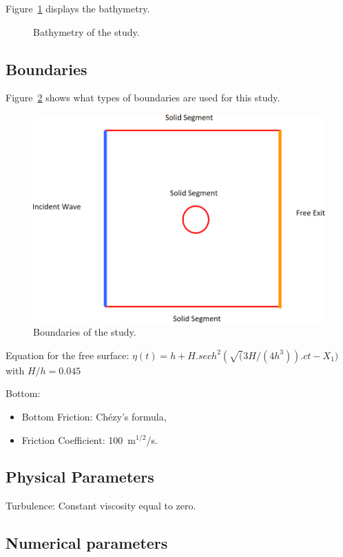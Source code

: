 Figure~\ref{fig:island:bathy} displays the bathymetry.

\begin{figure}[H]
\centering
{}
\caption{Bathymetry of the study.}\label{fig:island:bathy}
\end{figure}


\subsection{Boundaries}

Figure~\ref{fig:island:boundaries} shows what types of boundaries are used for
this study.
\begin{figure}[H]
\centering
\includegraphics[width=.6\textwidth]{img/boundaries.png}
\caption{Boundaries of the study.}\label{fig:island:boundaries}
\end{figure}

Equation for the free surface:
$\eta(t)= h+H.sech^{2}(\sqrt(3H/(4h^{3})).ct-X_{1})$ with $H/h=0.045$

Bottom:
\begin{itemize}
\item Bottom Friction: Chézy's formula,
\item Friction Coefficient: 100~m$^{1/2}$/s.
\end{itemize}

\subsection{Physical Parameters}

Turbulence: Constant viscosity equal to zero.

\subsection{Numerical parameters}


